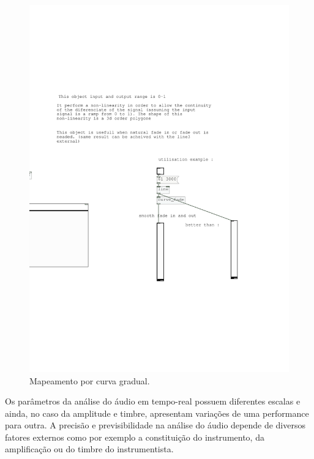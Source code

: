 \documentclass[draft]{ppgmus}
\begin{document}
\begin{figure}
\includegraphics[scale=.6]{mapping3}
\caption{Mapeamento por curva gradual.}
\label{mapping3}
\end{figure}

Os parâmetros da análise do áudio em tempo-real possuem diferentes
escalas e ainda, no caso da amplitude e timbre, apresentam variações de uma
performance para outra. A precisão e previsibilidade na análise do áudio 
depende de diversos fatores externos como por exemplo a constituição do instrumento, da
amplificação ou do timbre do instrumentista.
\end{document}
